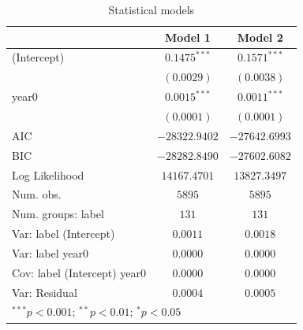
\begin{table}
\begin{center}
\begin{tabular}{l c c}
\hline
 & Model 1 & Model 2 \\
\hline
(Intercept)                  & $0.1475^{***}$ & $0.1571^{***}$ \\
                             & $(0.0029)$     & $(0.0038)$     \\
year0                        & $0.0015^{***}$ & $0.0011^{***}$ \\
                             & $(0.0001)$     & $(0.0001)$     \\
\hline
AIC                          & $-28322.9402$  & $-27642.6993$  \\
BIC                          & $-28282.8490$  & $-27602.6082$  \\
Log Likelihood               & $14167.4701$   & $13827.3497$   \\
Num. obs.                    & $5895$         & $5895$         \\
Num. groups: label           & $131$          & $131$          \\
Var: label (Intercept)       & $0.0011$       & $0.0018$       \\
Var: label year0             & $0.0000$       & $0.0000$       \\
Cov: label (Intercept) year0 & $0.0000$       & $0.0000$       \\
Var: Residual                & $0.0004$       & $0.0005$       \\
\hline
\multicolumn{3}{l}{\scriptsize{$^{***}p<0.001$; $^{**}p<0.01$; $^{*}p<0.05$}}
\end{tabular}
\caption{Statistical models}
\label{table:coefficients}
\end{center}
\end{table}

